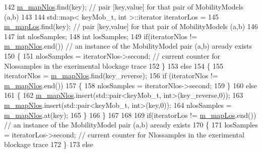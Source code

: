 \begin{DoxyCode}
142                                                          \hyperlink{classns3_1_1MmWaveLosTracker_ab8a492fa8798f2f775de311a6e619b19}{m\_mapNlos}.find(key); \textcolor{comment}{// pair [key,value]
       for that pair of MobilityModels (a,b) }
143 
144         std::map< keyMob\_t, int >::iterator iteratorLos =
145                                                          \hyperlink{classns3_1_1MmWaveLosTracker_a1ccd3a19ade5ca4b1e94bd113c593cd3}{m\_mapLos}.find(key); \textcolor{comment}{// pair [key,value]
       for that pair of MobilityModels (a,b) }
146 
147         \textcolor{keywordtype}{int} nlosSamples;
148         \textcolor{keywordtype}{int} losSamples;
149         \textcolor{keywordflow}{if}(iteratorNlos != \hyperlink{classns3_1_1MmWaveLosTracker_ab8a492fa8798f2f775de311a6e619b19}{m\_mapNlos}.end()) \textcolor{comment}{// an instance of the MobilityModel pair (a,b) aready
       exists}
150         \{
151                 nlosSamples = iteratorNlos->second; \textcolor{comment}{// current counter for Nlossamples in the exerimental
       blockage trace}
152         \}
153         \textcolor{keywordflow}{else}
154         \{
155                 iteratorNlos = \hyperlink{classns3_1_1MmWaveLosTracker_ab8a492fa8798f2f775de311a6e619b19}{m\_mapNlos}.find(key\_reverse);
156                 \textcolor{keywordflow}{if} (iteratorNlos != \hyperlink{classns3_1_1MmWaveLosTracker_ab8a492fa8798f2f775de311a6e619b19}{m\_mapNlos}.end())
157                 \{
158                         nlosSamples = iteratorNlos->second;
159                 \} 
160                 \textcolor{keywordflow}{else}
161                 \{
162                         \hyperlink{classns3_1_1MmWaveLosTracker_ab8a492fa8798f2f775de311a6e619b19}{m\_mapNlos}.insert(std::pair<keyMob\_t, int>(key\_reverse,0));
163                         \hyperlink{classns3_1_1MmWaveLosTracker_ab8a492fa8798f2f775de311a6e619b19}{m\_mapNlos}.insert(std::pair<keyMob\_t, int>(key,0));
164                         nlosSamples = \hyperlink{classns3_1_1MmWaveLosTracker_ab8a492fa8798f2f775de311a6e619b19}{m\_mapNlos}.at(key);
165                 \}
166         \}
167 
168 
169         \textcolor{keywordflow}{if}(iteratorLos != \hyperlink{classns3_1_1MmWaveLosTracker_a1ccd3a19ade5ca4b1e94bd113c593cd3}{m\_mapLos}.end()) \textcolor{comment}{// an instance of the MobilityModel pair (a,b) aready
       exists}
170         \{
171                 losSamples = iteratorLos->second; \textcolor{comment}{// current counter for Nlossamples in the exerimental
       blockage trace}
172         \}
173         \textcolor{keywordflow}{else}

\end{DoxyCode}
